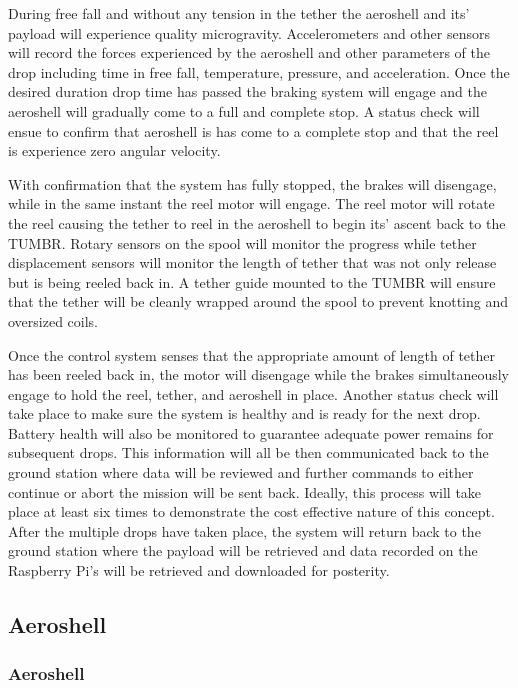During free fall and without any tension in the tether the aeroshell and its' payload will experience quality microgravity. Accelerometers and other sensors will record the forces experienced by the aeroshell and other parameters of the drop including time in free fall, temperature, pressure, and acceleration. Once the desired duration drop time has passed the braking system will engage and the aeroshell will gradually come to a full and complete stop. A status check will ensue to confirm that aeroshell is has come to a complete stop and that the reel is experience zero angular velocity. 

With confirmation that the system has fully stopped, the brakes will disengage, while in the same instant the reel motor will engage. The reel motor will rotate the reel causing the tether to reel in the aeroshell to begin its' ascent back to the TUMBR. Rotary sensors on the spool will monitor the progress while tether displacement sensors will monitor the length of tether that was not only release but is being reeled back in. A tether guide mounted to the TUMBR will ensure that the tether will be cleanly wrapped around the spool to prevent knotting and oversized coils. 

Once the control system senses that the appropriate amount of length of tether has been reeled back in, the motor will disengage while the brakes simultaneously engage to hold the reel, tether, and aeroshell in place. Another status check will take place to make sure the system is healthy and is ready for the next drop. Battery health will also be monitored to guarantee adequate power remains for subsequent drops. This information will all be then communicated back to the ground station where data will be reviewed and further commands to either continue or abort the mission will be sent back. Ideally, this process will take place at least six times to demonstrate the cost effective nature of this concept. After the multiple drops have taken place, the system will return back to the ground station where the payload will be retrieved and data recorded on the Raspberry Pi's will be retrieved and downloaded for posterity.

\subsection{Aeroshell}

\subsubsection{Aeroshell}

